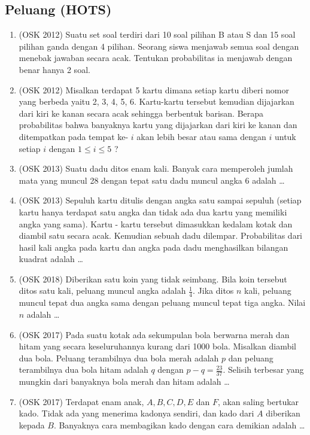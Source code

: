 \documentclass[11pt]{scrartcl}
\begin{document}
\subsection{Peluang (HOTS)}
\begin{enumerate}
            \item (OSK 2012) Suatu set soal terdiri dari 10 soal pilihan B atau S dan 15 soal pilihan ganda dengan 4 pilihan. Seorang siswa menjawab semua soal dengan menebak jawaban secara acak. Tentukan probabilitas ia menjawab dengan benar hanya 2 soal.
            
            \item (OSK 2012) Misalkan terdapat 5 kartu dimana setiap kartu diberi nomor yang berbeda yaitu 2, 3, 4, 5, 6. Kartu-kartu tersebut kemudian dijajarkan dari kiri ke kanan secara acak sehingga berbentuk barisan. Berapa probabilitas bahwa banyaknya kartu yang dijajarkan dari kiri ke kanan dan ditempatkan pada tempat ke- $i$ akan lebih besar atau sama dengan $i$ untuk setiap $i$ dengan $1 \le i \le 5$ ?
            
            \item (OSK 2013) Suatu dadu ditos enam kali. Banyak cara memperoleh jumlah mata yang muncul 28 dengan tepat satu dadu muncul angka 6 adalah \dots
            
            \item (OSK 2013) Sepuluh kartu ditulis dengan angka satu sampai sepuluh (setiap kartu hanya terdapat satu angka dan tidak ada dua kartu yang memiliki angka yang sama). Kartu - kartu tersebut dimasukkan kedalam kotak dan diambil satu secara acak. Kemudian sebuah dadu dilempar. Probabilitas dari hasil kali angka pada kartu dan angka pada dadu menghasilkan bilangan kuadrat adalah \dots
            
            \item (OSK 2018) Diberikan satu koin yang tidak seimbang. Bila koin tersebut ditos satu kali, peluang muncul angka adalah $\frac{1}{4}$. Jika ditos $n$ kali, peluang muncul tepat dua angka sama dengan peluang muncul tepat tiga angka. Nilai $n$ adalah \dots
            
            \item (OSK 2017) Pada suatu kotak ada sekumpulan bola berwarna merah dan hitam yang secara keseluruhannya kurang dari 1000 bola. Misalkan diambil dua bola. Peluang terambilnya dua bola merah adalah $p$ dan peluang terambilnya dua bola hitam adalah $q$ dengan $p-q =\frac{23}{37}$. Selisih terbesar yang mungkin dari banyaknya bola merah dan hitam adalah \dots
            
            \item (OSK 2017) Terdapat enam anak, $A, B, C, D, E$ dan $F$, akan saling bertukar kado. Tidak ada yang menerima kadonya sendiri, dan kado dari $A$ diberikan kepada $B$. Banyaknya cara membagikan kado dengan cara demikian adalah \dots
        \end{enumerate}
\end{document}
